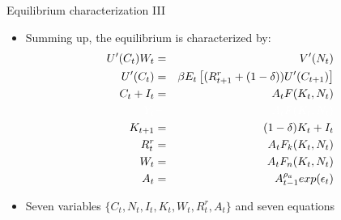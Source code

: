 \documentclass[9pt,xcolor={dvipsnames}]{beamer}
\newcommand{\bit}{\begin{itemize}}
\newcommand{\eit}{\end{itemize}}
\newcommand{\rc}{\color{red}}
\begin{document}
%
%
%
%
%
%
%
%
%

\begin{frame}{Equilibrium characterization III}

\bit
\setlength\itemsep{1.5em}

\item Summing up, the equilibrium is characterized by:
\begin{eqnarray}
U'(C_t)W_t &=& V'(N_t) \nonumber \\
U'(C_t) &=& \beta E_t\left[(R^{r}_{t+1}+(1-\delta)) U'(C_{t+1})\right] \nonumber \\
C_t + I_t &=& A_t F(K_t, N_t) \nonumber \\
{\color{white} Y_t} &{\color{white}=}& {\color{white}A_t F(K_t, N_t)} \nonumber \\
K_{t+1} &=& (1-\delta) K_t + I_t \nonumber \\
R^{r}_t &=& A_t F_k (K_t, N_t) \nonumber \\
W_t &=& A_t F_n (K_t, N_t) \nonumber \\
A_t &=& A_{t-1}^{\rho_a}exp(\epsilon_t) \nonumber
\end{eqnarray}

\item Seven variables $\{C_t, N_t, I_t, K_{t}, W_t, R^{r}_t, A_t\}$ and seven equations

\eit

\end{frame}
\end{document}
